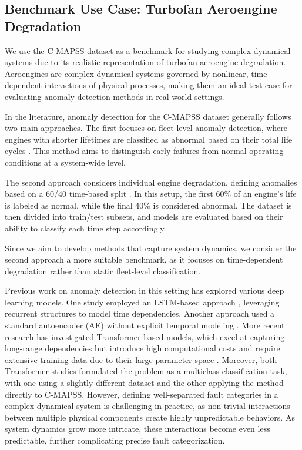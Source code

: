\subsection{Benchmark Use Case: Turbofan Aeroengine Degradation}
We use the C-MAPSS dataset as a benchmark for studying complex dynamical systems due to its realistic representation of turbofan aeroengine degradation. Aeroengines are complex dynamical systems governed by nonlinear, time-dependent interactions of physical processes, making them an ideal test case for evaluating anomaly detection methods in real-world settings.\par

In the literature, anomaly detection for the C-MAPSS dataset generally follows two main approaches. The first focuses on fleet-level anomaly detection, where engines with shorter lifetimes are classified as abnormal based on their total life cycles \cite{jakubowski_anomaly_2022,yildirim_enhancing_2024}. This method aims to distinguish early failures from normal operating conditions at a system-wide level.

The second approach considers individual engine degradation, defining anomalies based on a 60/40 time-based split \cite{bataineh_autoencoder_2020,zhu_anomaly_2024}. In this setup, the first 60\% of an engine’s life is labeled as normal, while the final 40\% is considered abnormal. The dataset is then divided into train/test subsets, and models are evaluated based on their ability to classify each time step accordingly.

Since we aim to develop methods that capture system dynamics, we consider the second approach a more suitable benchmark, as it focuses on time-dependent degradation rather than static fleet-level classification.

Previous work on anomaly detection in this setting has explored various deep learning models. One study employed an LSTM-based approach \cite{zhu_anomaly_2024}, leveraging recurrent structures to model time dependencies. Another approach used a standard autoencoder (AE) without explicit temporal modeling \cite{bataineh_autoencoder_2020}. More recent research has investigated Transformer-based models, which excel at capturing long-range dependencies but introduce high computational costs and require extensive training data due to their large parameter space \cite{inproceedings,liu_deep_2023}. Moreover, both Transformer studies formulated the problem as a multiclass classification task, with one using a slightly different dataset and the other applying the method directly to C-MAPSS. However, defining well-separated fault categories in a complex dynamical system is challenging in practice, as non-trivial interactions between multiple physical components create highly unpredictable behaviors. As system dynamics grow more intricate, these interactions become even less predictable, further complicating precise fault categorization.
